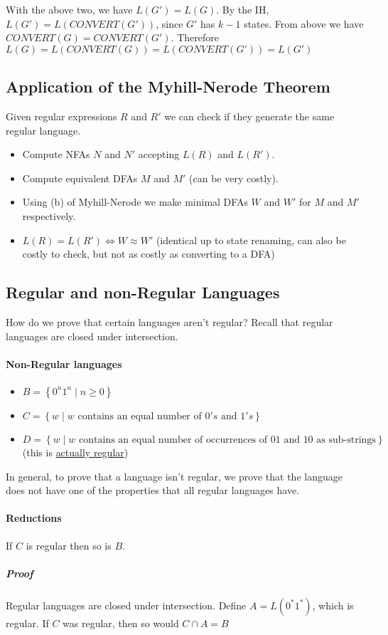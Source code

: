\documentclass[12 pt]{article}
\begin{document}
With the above two, we have $L(G') = L(G)$. By the IH, $L(G') =
L(CONVERT(G'))$, since $G'$ has $k-1$ states. From above we have
$CONVERT(G) = CONVERT(G')$. Therefore $L(G) = L(CONVERT(G)) =
L(CONVERT(G')) = L(G')$
\subsection{Application of the Myhill-Nerode Theorem}
Given regular expressions $R$ and $R'$ we can check if they generate
the same regular language.
\begin{itemize}
\item Compute NFAs $N$ and $N'$ accepting $L(R)$ and $L(R')$.
\item Compute equivalent DFAs $M$ and $M'$ (can be very costly).
\item Using (b) of Myhill-Nerode we make minimal DFAs $W$ and $W'$ for
  $M$ and $M'$ respectively.
\item $L(R) = L(R') \iff W \approx W'$ (identical up to state
  renaming, can also be costly to check, but not as costly as
  converting to a DFA)
\end{itemize}
\subsection{Regular and non-Regular Languages}
How do we prove that certain languages aren't regular? Recall that
regular languages are closed under intersection.
\paragraph{Non-Regular languages}
\begin{itemize}
\item $B = \left\{0^n 1^n \mid n \geq 0\right\}$
\item $C = \left\{w \mid w \text{ contains an equal number of } 0's
    \text{ and } 1's\right\}$
\item $D = \left\{w \mid w \text{ contains an equal number of
      occurrences of }01 \text{ and } 10 \text{ as
      sub-strings}\right\}$ (this is \underline{actually regular})
\end{itemize}

In general, to prove that a language isn't regular, we prove that the
language does not have one of the properties that all regular
languages have.

\paragraph{Reductions}
If $C$ is regular then so is $B$.
\subparagraph{Proof}
  Regular languages are closed under intersection. Define $A =
  L(0^*1^*)$, which is regular. If $C$ was regular, then so would $C
  \cap A = B$
\end{document}
